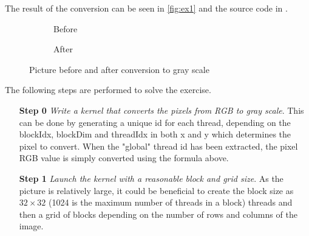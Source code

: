 \noindent The result of the conversion can be seen in \autoref{fig:ex1} and the source code in \cite{exercises}.
\begin{figure}[ht]
	\centering
	\begin{subfigure}{.5\textwidth}
		\centering
		\caption{Before}
		\label{fig:ex1-before}
	\end{subfigure}%
	\begin{subfigure}{.5\textwidth}
		\centering
		\caption{After}
		\label{fig:ex1-after}
	\end{subfigure}
	\caption{Picture before and after conversion to gray scale}
	\label{fig:ex1}
\end{figure}
The following steps are performed to solve the exercise.
\begin{enumerate}
	\item[\textbf{Step 0}]
	\textit{Write a kernel that converts the pixels from RGB to gray scale}.
	This can be done by generating a unique id for each thread, depending on the blockIdx, blockDim and threadIdx in both x and y which determines the pixel to convert.
	When the "global" thread id has been extracted, the pixel RGB value is simply converted using the formula above.
	\item[\textbf{Step 1}]
	\textit{Launch the kernel with a reasonable block and grid size}.
	As the picture is relatively large, it could be beneficial to create the block size as $32\times32$ (1024 is the maximum number of threads in a block) threads and then a grid of blocks depending on the number of rows and columns of the image.
\end{enumerate}